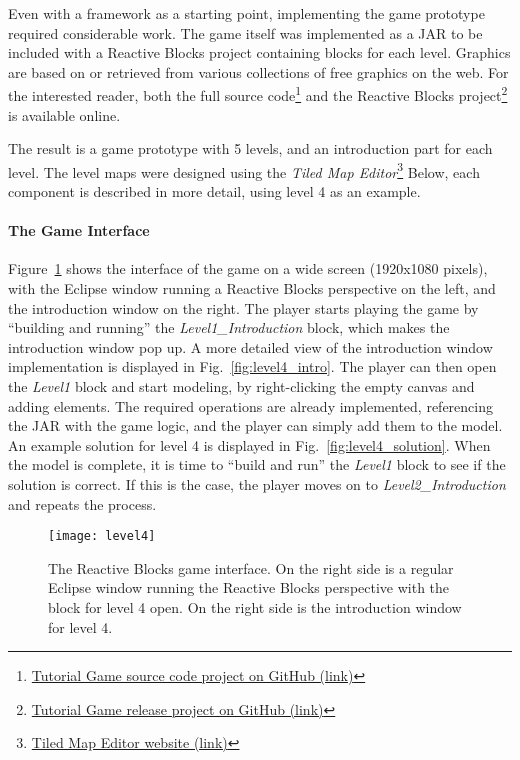 \noindent
Even with a framework as a starting point, implementing the game prototype required considerable work. The game itself was implemented as a JAR to be included with a Reactive Blocks project containing blocks for each level. Graphics are based on or retrieved from various collections of free graphics on the web. For the interested reader, both the full source code\footnote{\href{https://github.com/Desarc/reactive-blocks-tutorials/tree/master/no.ntnu.oyvinric.tutorialgame}{Tutorial Game source code project on GitHub (link)}} and the Reactive Blocks project\footnote{\href{https://github.com/Desarc/tutorial-game}{Tutorial Game release project on GitHub (link)}} is available online.

\noindent
The result is a game prototype with 5 levels, and an introduction part for each level. The level maps were designed using the \emph{Tiled Map Editor}\footnote{\href{http://www.mapeditor.org/}{Tiled Map Editor website (link)}} Below, each component is described in more detail, using level 4 as an example.

\paragraph{The Game Interface}
Figure~\ref{fig:level4} shows the interface of the game on a wide screen (1920x1080 pixels), with the Eclipse window running a Reactive Blocks perspective on the left, and the introduction window on the right. The player starts playing the game by ``building and running'' the \emph{Level1\_Introduction} block, which makes the introduction window pop up. A more detailed view of the introduction window implementation is displayed in Fig.~\ref{fig:level4_intro}. The player can then open the \emph{Level1} block and start modeling, by right-clicking the empty canvas and adding elements. The required operations are already implemented, referencing the JAR with the game logic, and the player can simply add them to the model. An example solution for level 4 is displayed in Fig.~\ref{fig:level4_solution}. When the model is complete, it is time to ``build and run'' the \emph{Level1} block to see if the solution is correct. If this is the case, the player moves on to \emph{Level2\_Introduction} and repeats the process.

\begin{figure}[htp]
	\centering
	\texttt{[image: level4]}
	\caption[The Reactive Blocks game user interface]{The Reactive Blocks game interface. On the right side is a regular Eclipse window running the Reactive Blocks perspective with the block for level 4 open. On the right side is the introduction window for level 4.}
	\label{fig:level4}
\end{figure}

